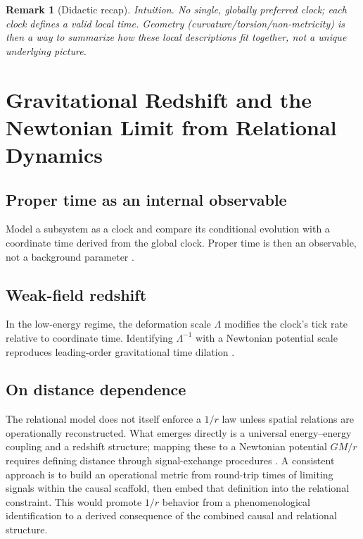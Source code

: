 \documentclass[11pt,a4paper]{article}
\theoremstyle{thmstyleone}
\theoremstyle{thmstyletwo}
\newtheorem{remark}{Remark}
\theoremstyle{thmstylethree}
\begin{document}
    \begin{remark}[Didactic recap]
        \emph{Intuition.} No single, globally preferred clock; each clock defines a valid local time. Geometry (curvature/torsion/non-metricity) is then a way to \emph{summarize} how these local descriptions fit together, not a unique underlying picture.
    \end{remark}

    \section{Gravitational Redshift and the Newtonian Limit from Relational Dynamics}\label{sec:redshift_newton}

    \subsection{Proper time as an internal observable}\label{subsec:propertime}
        Model a subsystem as a clock and compare its conditional evolution with a coordinate time derived from the global clock. Proper time is then an observable, not a background parameter \cite{SinghFriedrich2025}.

    \subsection{Weak-field redshift}\label{subsec:weakfield}
        In the low-energy regime, the deformation scale $\Lambda$ modifies the clock’s tick rate relative to coordinate time. Identifying $\Lambda^{-1}$ with a Newtonian potential scale reproduces leading-order gravitational time dilation \cite{SinghFriedrich2025,Will2014}.

    \subsection{On distance dependence}\label{subsec:distance_dependence}
        The relational model does not itself enforce a $1/r$ law unless spatial relations are operationally reconstructed. What emerges directly is a universal energy--energy coupling and a redshift structure; mapping these to a Newtonian potential $GM/r$ requires defining distance through signal-exchange procedures \cite{Pineda2026}. A consistent approach is to build an operational metric from round-trip times of limiting signals within the causal scaffold, then embed that definition into the relational constraint. This would promote $1/r$ behavior from a phenomenological identification to a derived consequence of the combined causal and relational structure.
\end{document}
